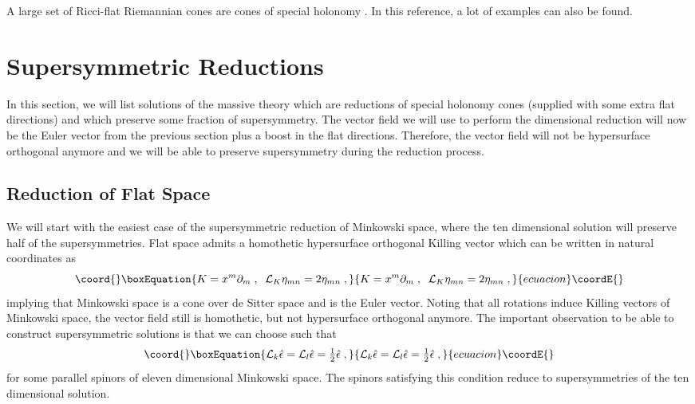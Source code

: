 \documentclass[a4paper,12pt]{article}
\providecommand{\ft}[2]{{\textstyle\frac{#1}{#2}}}
\begin{document}
A large set of Ricci-flat Riemannian cones are cones of special holonomy \cite{Acharya:1998db}. In this reference, a lot of examples can also be found. 
\section{Supersymmetric Reductions}\label{susy}
In this section, we will list solutions of the massive theory which are reductions of special holonomy cones (supplied with some extra flat directions) and which preserve some fraction of supersymmetry. The vector field we will use to perform the dimensional reduction will now be the Euler vector from the previous section plus a boost in the flat directions. Therefore, the vector field will not be hypersurface orthogonal anymore and we will be able to preserve supersymmetry during the reduction process. 
\subsection{Reduction of Flat Space}
We will start with the easiest case of the supersymmetric reduction of Minkowski space, where the ten dimensional solution will preserve half of the supersymmetries.
Flat space admits a homothetic hypersurface orthogonal Killing vector \coordHE{} which can be written in natural coordinates as 
\begin{equation}\coord{}\boxEquation{
K=x^m \partial_m \; , \; \; \mathcal{L}_K\eta_{mn}=2\eta_{mn}\; ,
}{
K=x^m \partial_m \; , \; \; \mathcal{L}_K\eta_{mn}=2\eta_{mn}\; ,
}{ecuacion}\coordE{}\end{equation}
implying that Minkowski space is a cone over de Sitter space and \coordHE{} is the Euler vector.
 Noting that all \coordHE{} rotations induce Killing vectors \coordHE{} of Minkowski space, the vector field 
 \coordHE{} still is homothetic, but not hypersurface orthogonal anymore. The important observation to be able 
 to construct supersymmetric solutions is that we can choose \coordHE{} such that 
\begin{equation}\coord{}\boxEquation{
\mathcal{L}_k\hat{\epsilon}=\mathcal{L}_l \hat{\epsilon}=\ft12 \hat{\epsilon}\; ,
}{
\mathcal{L}_k\hat{\epsilon}=\mathcal{L}_l \hat{\epsilon}=\ft12 \hat{\epsilon}\; ,
}{ecuacion}\coordE{}\end{equation}
for some parallel spinors \myHighlight{$\hat{\epsilon}$}\coordHE{} of eleven dimensional Minkowski space. The spinors satisfying this condition reduce to supersymmetries of the ten dimensional solution.
\end{document}
